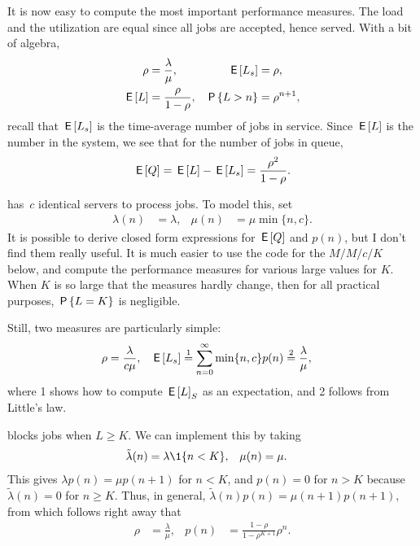 \documentclass[stochastic-or.tex]{subfiles}
\begin{document}
It is now easy to compute the most important performance measures.
The load and the utilization are equal since all jobs are accepted, hence served.  With a bit of algebra,
\begin{align}\label{eq:el}
\rho &= \frac{\lambda}{\mu}, & \E{\Ls} &= \rho, \\
  \E \L &= \frac \rho{1-\rho}, & \P{\L> n} &= \rho^{n+1},
\end{align}
recall that $\E\Ls$ is the time-average number of jobs in service. Since $\E\L$ is the number in the system, we see that for the number of jobs in queue,
\begin{equation*}
\E \QQ = \E \L - \E{\Ls} = \frac{\rho^2}{1-\rho}.
\end{equation*}



 has~$c$ identical servers to process jobs.
To model this, set
\begin{align*}
\lambda(n) &= \lambda, & \mu(n) &= \mu \min\{n, c\}.
\end{align*}
It is possible to derive closed form expressions for $\E \QQ$ and $p(n)$, but I don't find them really useful.
It is much easier to use the code for the $M/M/c/K$ below, and compute the performance measures for various large values for $K$.
When $K$ is so large that the measures hardly change, then for all practical purposes, $\P{L=K}$ is negligible.

Still, two measures are particularly simple:
\begin{align*}
  \rho & = \frac{\lambda}{ c\mu}, & \E{\Ls} &\stackrel1= \sum_{n=0}^{\infty}\min\{n,c\} p(n) \stackrel2= \frac{\lambda}\mu,
\end{align*}
where 1 shows how to compute $\E L_{S}$ as an expectation, and 2 follows from Little's law.



 blocks jobs when $L\geq K$.
We can implement this by taking
\begin{align*}
\tilde \lambda(n) &= \lambda \1{n < K}, & \mu(n) &= \mu.
\end{align*}
This gives $\lambda p(n) = \mu p(n+1)$ for $n<K$, and $p(n) = 0$ for $n>K$ because $\tilde \lambda(n) = 0$ for $n\geq K$.
Thus, in general, $\tilde \lambda(n) p(n) = \mu(n+1)p(n+1)$, from which follows right away that
 \begin{align*}
\rho &= \frac{\lambda}{\mu}, & p(n) &= \frac{1-\rho}{1-\rho^{K+1}} \rho^n.
\end{align*}
\end{document}
